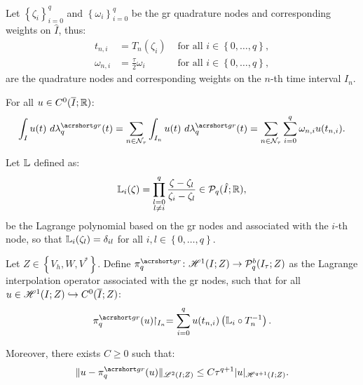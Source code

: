 Let $\left\{ \zeta_i \right\}_{i = 0}^{q}$ and $\left\{ \omega_i \right\}_{i = 0}^{q}$ be the \acrfull{gr} quadrature nodes and corresponding weights on $\hat{I}$, thus:
\begin{align}
    t_{n, i} &= T_n(\zeta_i) &\text{ for all } i \in \left\{ 0, \dots, q \right\}, \\
    \omega_{n, i} &= \frac{\tau}{2} \omega_i &\text{ for all } i \in \left\{ 0, \dots, q \right\},
\end{align}
are the quadrature nodes and corresponding weights on the $n$-th time interval $I_n$.

\begin{definition}[$\lambdaGR_q$]
    For all $u \in C^0(\overline{I}; \mathbb{R})$:
    \begin{align}
        \int_I u(t) ~ d \lambdaGR_q(t) = \sum_{n \in \TimeIndices} \int_{I_n} u(t) ~ d \lambdaGR_q(t) = \sum_{n \in \TimeIndices} \sum_{i = 0}^q \omega_{n, i} u(t_{n, i}).
    \end{align}
\end{definition}

\begin{definition}
    Let $\mathbb{L}$ defined as:
    \begin{align}
        \mathbb{L}_i (\zeta) = \prod_{\substack{l = 0 \\ l \neq i}}^q \frac{\zeta - \zeta_l}{\zeta_i - \zeta_l} \in \mathcal{P}_{q}(\hat{I}; \mathbb{R}),
    \end{align}
    be the Lagrange polynomial based on the \acrshort{gr} nodes and associated with the $i$-th node, so that $\mathbb{L}_i (\zeta_l) = \delta_{i l}$ for all $i, l \in \left\{ 0, \dots, q\right\}$.
\end{definition}

\begin{definition}[$\InterpolantGR_q$] \label{def:interpolant_gr}
    Let $Z \in \left\{V_h, W, V^* \right\}$. Define $\InterpolantGR_q \colon \SpaceHk{1}(I; Z) \rightarrow \SpacePolynomials{q}^b(\TimeMesh; Z)$ as the Lagrange interpolation operator associated with the \acrshort{gr} nodes, such that for all $u \in \mathscr{H}^{1}(I; Z) \hookrightarrow C^0(\overline{I}; Z)$:
    \begin{align}
        \InterpolantGR_q(u) \Restriction_{I_n} = \sum_{i = 0}^q u(t_{n, i}) \left( \Lagrange_i \circ T_n^{-1} \right).
    \end{align}

    Moreover, there exists $C \geq 0$ such that:
    \begin{align}
        \lVert u - \InterpolantGR_q(u) \rVert_{\SpaceLp{2}(I; Z)} \leq C \tau^{q + 1} \lvert u \rvert_{\SpaceHk{q + 1}(I; Z)}.
    \end{align}
\end{definition}

